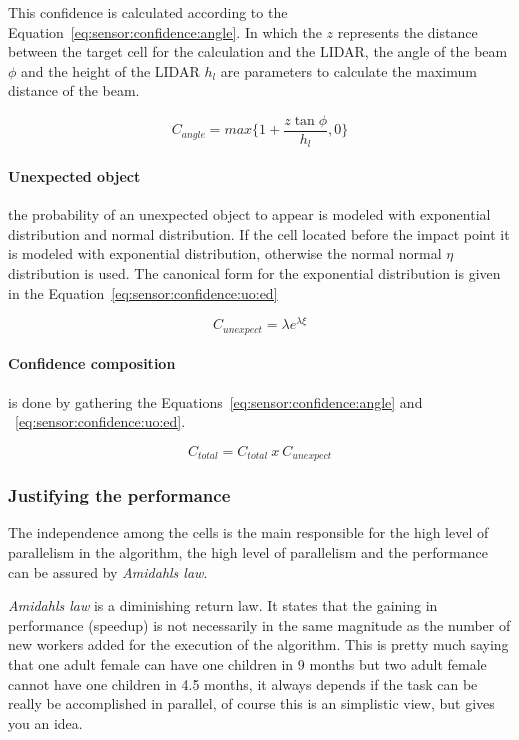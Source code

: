This confidence is calculated according to the Equation~\ref{eq:sensor:confidence:angle}. In which the $z$ represents the distance between the target cell for the calculation and the LIDAR, the angle of the beam $\phi$ and the height of the LIDAR $h_l$ are parameters to calculate the maximum distance of the beam. 

\begin{equation}
\label{eq:sensor:confidence:angle}
C_{angle}=max\{1+\frac{z\tan{\phi}}{h_l},0\}
\end{equation}

\paragraph*{Unexpected object} the probability of an unexpected object to appear is modeled with exponential distribution and normal distribution. If the cell located before the impact point it is modeled with exponential distribution, otherwise the normal normal $\eta$ distribution is used. The canonical form for the exponential distribution is given in the Equation~\ref{eq:sensor:confidence:uo:ed}

\begin{equation}
\label{eq:sensor:confidence:uo:ed}
C_{unexpect}=\lambda e^{\lambda \xi}
\end{equation}

\paragraph*{Confidence composition} is done by gathering the Equations~\ref{eq:sensor:confidence:angle} and ~\ref{eq:sensor:confidence:uo:ed}.

\begin{equation}
C_{total}=C_{total}\ x\ C_{unexpect}
\end{equation}

\subsubsection{Justifying the performance}

The independence among the cells is the main responsible for the high level of parallelism in the algorithm, the high level of parallelism and the performance can be assured by \textit{Amidahls law}.

\textit{Amidahls law} is a diminishing return law. It states that the gaining in performance (speedup) is not necessarily in the same magnitude as the number of new workers added for the execution of the algorithm\cite{Amdahl:1967:VSP:1465482.1465560}. This is pretty much saying that one adult female can have one children in 9 months but two adult female cannot have one children in 4.5 months, it always depends if the task can be really be accomplished in parallel, of course this is an simplistic view, but gives you an idea.

